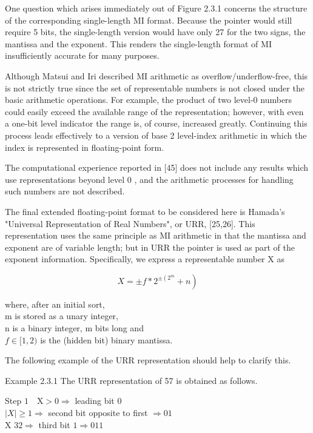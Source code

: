 \documentclass[10pt]{article}
\begin{document}
One question which arises immediately out of Figure 2.3.1 concerns the structure of the corresponding single-length MI format. Because the pointer would still require 5 bits, the single-length version would have only 27 for the two signs, the mantissa and the exponent. This renders the single-length format of MI insufficiently accurate for many purposes.

Although Matsui and Iri described MI arithmetic as overflow/underflow-free, this is not strictly true since the set of representable numbers is not closed under the basic arithmetic operations. For example, the product of two level-0 numbers could easily exceed the available range of the representation; however, with even a one-bit level indicator the range is, of course, increased greatly. Continuing this process leads effectively to a version of base 2 level-index arithmetic in which the index is represented in floating-point form.

The computational experience reported in [45] does not include any results which use representations beyond level 0 , and the arithmetic processes for handling such numbers are not described.

The final extended floating-point format to be considered here is Hamada's "Universal Representation of Real Numbers", or URR, [25,26]. This representation uses the same principle as MI arithmetic in that the mantissa and exponent are of variable length; but in URR the pointer is used as part of the exponent information. Specifically, we express a representable number X as


\begin{equation*}
\left.X= \pm f * 2^{ \pm\left(2^{m}\right.}+n\right) \tag{2.3.1}
\end{equation*}


where, after an initial sort,\\
m is stored as a unary integer,\\
n is a binary integer, m bits long and\\
$f \in[1,2)$ is the (hidden bit) binary mantissa.

The following example of the URR representation should help to clarify this.

Example 2.3.1 The URR representation of 57 is obtained as follows.

Step $1 \quad \mathrm{X}>0 \Rightarrow$ leading bit 0\\
$|X| \geqslant 1 \Rightarrow$ second bit opposite to first $\Rightarrow 01$\\
X $32 \Rightarrow$ third bit $1 \Rightarrow 011$
\end{document}
